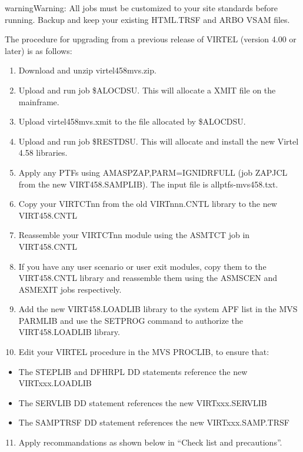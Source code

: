 \documentclass[letterpaper,10pt,english]{sphinxmanual}
\begin{document}
\begin{sphinxadmonition}{warning}{Warning:}
All jobs must be customized to your site standards before running. Backup and keep your existing HTML.TRSF and ARBO VSAM files.
\end{sphinxadmonition}

The procedure for upgrading from a previous release of VIRTEL (version 4.00 or later) is as follows:
\begin{enumerate}
\item {} 
Download and unzip virtel458mvs.zip.

\item {} 
Upload and run job \$ALOCDSU. This will allocate a XMIT file on the mainframe.

\item {} 
Upload virtel458mvs.xmit to the file allocated by \$ALOCDSU.

\item {} 
Upload and run job \$RESTDSU. This will allocate and install the new Virtel 4.58 libraries.

\item {} 
Apply any PTFs using AMASPZAP,PARM=IGNIDRFULL (job ZAPJCL from the new VIRT458.SAMPLIB). The input file is allptfs-mvs458.txt.

\item {} 
Copy your VIRTCTnn from the old VIRTnnn.CNTL library to the new VIRT458.CNTL

\item {} 
Reassemble your VIRTCTnn module using the ASMTCT job in VIRT458.CNTL

\item {} 
If you have any user scenario or user exit modules, copy them to the VIRT458.CNTL library and reassemble them using the ASMSCEN and ASMEXIT jobs respectively.

\item {} 
Add the new VIRT458.LOADLIB library to the system APF list in the MVS PARMLIB and use the SETPROG command to authorize the VIRT458.LOADLIB library.

\item {} 
Edit your VIRTEL procedure in the MVS PROCLIB, to ensure that:

\end{enumerate}
\begin{itemize}
\item {} 
The STEPLIB and DFHRPL DD statements reference the new VIRTxxx.LOADLIB

\item {} 
The SERVLIB DD statement references the new VIRTxxx.SERVLIB

\item {} 
The SAMPTRSF DD statement references the new VIRTxxx.SAMP.TRSF

\end{itemize}
\begin{enumerate}
\setcounter{enumi}{10}
\item {} 
Apply recommandations as shown below in “Check list and precautions”.

\end{enumerate}
\end{document}
